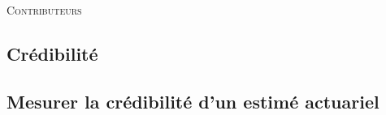 \documentclass[10pt, french]{article}
\begin{document}
\begin{center}
	\textsc{\Large Contributeurs}\\[0.5cm] 
\end{center}


\newpage

\begin{multicols*}{2}






\section{Crédibilité}

\subsection{Mesurer la crédibilité d'un estimé actuariel}


%
%
%
%



\end{multicols*}
\end{document}
